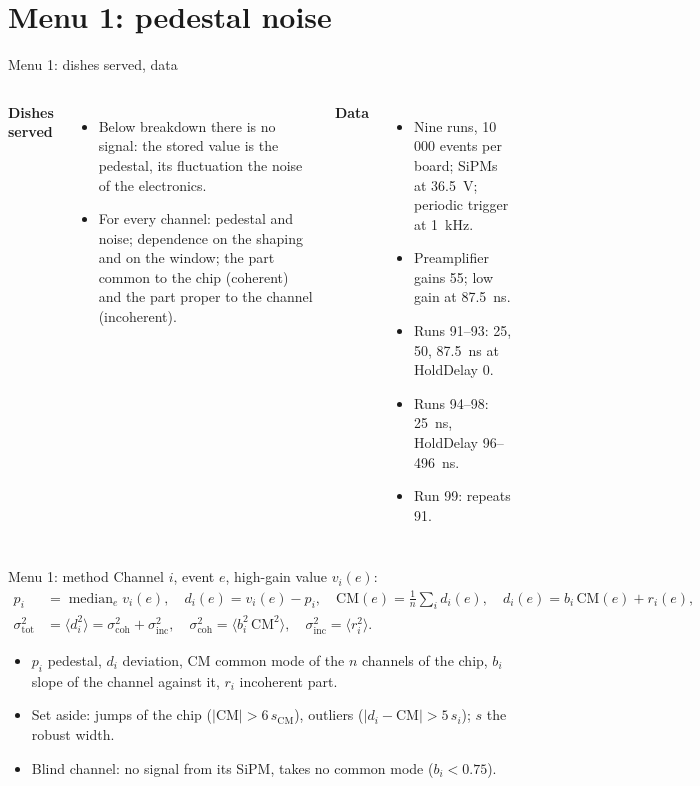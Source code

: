 \documentclass[10pt,aspectratio=169]{beamer}
\begin{document}
\section{Menu 1: pedestal noise}

\begin{frame}{Menu 1: dishes served, data}
\begin{columns}
\textbf{Dishes served}
\begin{itemize}
\item Below breakdown there is no signal: the stored value is the pedestal, its fluctuation
  the noise of the electronics.
\item For every channel: pedestal and noise; dependence on the shaping and on the window;
  the part common to the chip (coherent) and the part proper to the channel (incoherent).
\end{itemize}
\textbf{Data}
\begin{itemize}
\item Nine runs, 10\,000 events per board; SiPMs at 36.5~V; periodic trigger at 1~kHz.
\item Preamplifier gains 55; low gain at 87.5~ns.
\item Runs 91--93: 25, 50, 87.5~ns at HoldDelay 0.
\item Runs 94--98: 25~ns, HoldDelay 96--496~ns.
\item Run 99: repeats 91.
\end{itemize}
\end{columns}
\end{frame}

\begin{frame}{Menu 1: method}
Channel $i$, event $e$, high-gain value $v_i(e)$:
\begin{align*}
p_i &= \operatorname{median}_e v_i(e), \quad d_i(e) = v_i(e) - p_i, \quad
\mathrm{CM}(e) = \tfrac{1}{n}\textstyle\sum_i d_i(e), \quad d_i(e) = b_i\,\mathrm{CM}(e) + r_i(e),\\
\sigma_\mathrm{tot}^2 &= \langle d_i^2\rangle = \sigma_\mathrm{coh}^2 + \sigma_\mathrm{inc}^2,
\quad \sigma_\mathrm{coh}^2 = \langle b_i^2\,\mathrm{CM}^2\rangle, \quad
\sigma_\mathrm{inc}^2 = \langle r_i^2\rangle.
\end{align*}
\begin{itemize}
\item $p_i$ pedestal, $d_i$ deviation, $\mathrm{CM}$ common mode of the $n$ channels of the
  chip, $b_i$ slope of the channel against it, $r_i$ incoherent part.
\item Set aside: jumps of the chip ($|\mathrm{CM}| > 6\,s_\mathrm{CM}$), outliers
  ($|d_i - \mathrm{CM}| > 5\,s_i$); $s$ the robust width.
\item Blind channel: no signal from its SiPM, takes no common mode ($b_i < 0.75$).
\end{itemize}
\end{frame}
\end{document}
